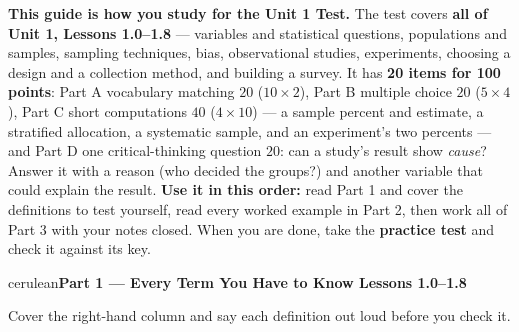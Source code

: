 \documentclass[10pt]{article}
\newcommand{\parthead}[1]{%
  \vspace{6pt}\noindent
  \begin{headlinebox}{cerulean}{\color{white}\bfseries #1}\end{headlinebox}%
  \vspace{4pt}}
\begin{document}
\namedateperiod

\vspace{0.10in}
\begin{remindbox}
\small
\textbf{This guide is how you study for the Unit 1 Test.} The test covers
\textbf{all of Unit 1, Lessons 1.0--1.8} --- variables and statistical questions, populations
and samples, sampling techniques, bias, observational studies, experiments, choosing a design
and a collection method, and building a survey. It has \textbf{20 items for 100 points}:
Part A vocabulary matching $20$ ($10 \times 2$), Part B multiple choice $20$ ($5 \times 4$),
Part C short computations $40$ ($4 \times 10$) --- a sample percent and estimate, a
stratified allocation, a systematic sample, and an experiment's two percents --- and Part D
one critical-thinking question $20$: can a study's result show \emph{cause}? Answer it with
a reason (who decided the groups?) and another variable that could explain the result.
\textbf{Use it in this order:} read Part 1 and cover the definitions to test yourself, read
every worked example in Part 2, then work all of Part 3 with your notes closed. When you
are done, take the \textbf{practice test} and check it against its key.
\end{remindbox}

\parthead{Part 1 --- Every Term You Have to Know \hfill Lessons 1.0--1.8}

\small
Cover the right-hand column and say each definition out loud before you check it.
\end{document}
